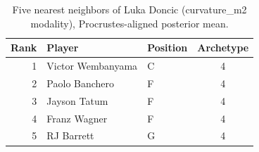 \begin{table}[htbp]
  \centering\small
  \begin{tabular}{rllc}
    \toprule
    Rank & Player & Position & Archetype \\
    \midrule
    1 & Victor Wembanyama & C & 4 \\
    2 & Paolo Banchero & F & 4 \\
    3 & Jayson Tatum & F & 4 \\
    4 & Franz Wagner & F & 4 \\
    5 & RJ Barrett & G & 4 \\
    \bottomrule
  \end{tabular}
  \caption{Five nearest neighbors of Luka Doncic (curvature_m2 modality), Procrustes-aligned posterior mean.}
  \label{tab:Luka_Doncic_neighbors_curvature_m2}
\end{table}

